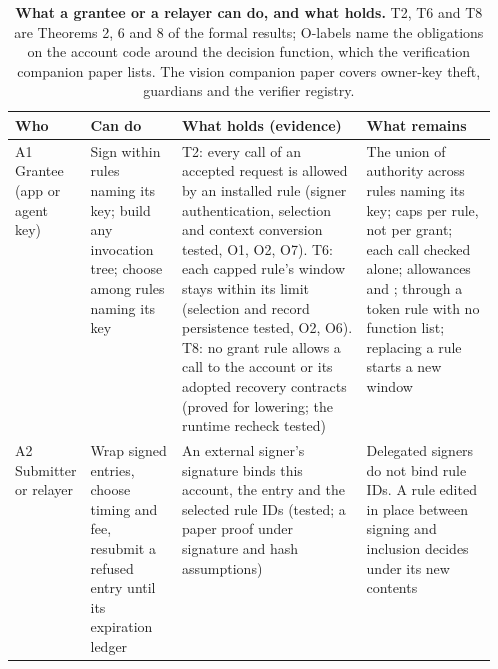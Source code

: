 \begin{table}[tbp]
\centering
\caption{\textbf{What a grantee or a relayer can do, and what holds.} T2, T6 and T8 are Theorems 2, 6 and 8 of the formal results; O-labels name the obligations on the account code around the decision function, which the verification companion paper lists. The vision companion paper covers owner-key theft, guardians and the verifier registry.}\label{tab:tab-grantee}
\scriptsize\begin{tabularx}{\linewidth}{@{}>{\raggedright\arraybackslash}p{0.1\linewidth}>{\raggedright\arraybackslash}p{0.19\linewidth}L>{\raggedright\arraybackslash}p{0.27\linewidth}@{}}
\toprule
\textbf{Who} & \textbf{Can do} & \textbf{What holds (evidence)} & \textbf{What remains} \\
\midrule
A1 Grantee (app or agent key) & Sign within rules naming its key; build any invocation tree; choose among rules naming its key & T2: every call of an accepted request is allowed by an installed rule (signer authentication, selection and context conversion tested, O1, O2, O7). T6: each capped rule's window stays within its limit (selection and record persistence tested, O2, O6). T8: no grant rule allows a call to the account or its adopted recovery contracts (proved for lowering; the runtime recheck tested) & The union of authority across rules naming its key; caps per rule, not per grant; each call checked alone; allowances and ;  through a token rule with no function list; replacing a rule starts a new window \\
A2 Submitter or relayer & Wrap signed entries, choose timing and fee, resubmit a refused entry until its expiration ledger & An external signer's signature binds this account, the entry and the selected rule IDs (tested; a paper proof under signature and hash assumptions) & Delegated signers do not bind rule IDs. A rule edited in place between signing and inclusion decides under its new contents \\
\bottomrule
\end{tabularx}
\end{table}
